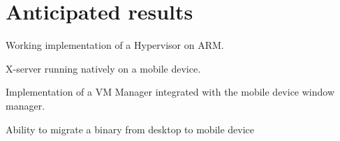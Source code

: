 \section{Anticipated results}
	\begin{itemize*}
	\item Working implementation of a Hypervisor on ARM.
  \item X-server running natively on a mobile device.
	\item Implementation of a VM Manager integrated with the mobile device window manager.
	\item Ability to migrate a binary from desktop to mobile device
	\end{itemize*}
